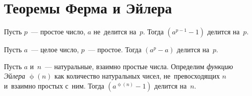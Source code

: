 
\section*{Теоремы Ферма и Эйлера}


\begingroup
    \ifdefined\mathup
        \def\eulerphi{\mathup{\phi}}%
    \else
        \def\eulerphi{\upphi}%
    \fi

Пусть $p$~--- простое число, $a$ не~делится на~$p$.
Тогда $(a^{p-1} - 1)$ делится на~$p$.

Пусть $a$~--- целое число, $p$~--- простое.
Тогда $(a^{p} - a)$ делится на~$p$.

Пусть $a$ и~$n$~--- натуральные, взаимно простые числа.
Определим \emph{функцию Эйлера} $\eulerphi(n)$ как количество натуральных
чисел, не~превосходящих $n$ и~взаимно простых с~ним.
Тогда $(a^{\eulerphi(n)} - 1)$ делится на~$n$.

